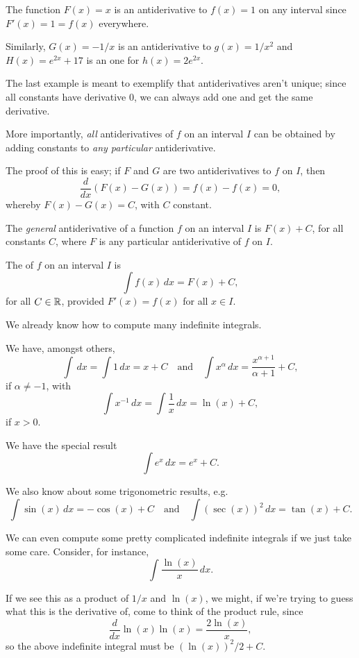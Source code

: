 \begin{example}
	The function $F(x) = x$ is an antiderivative to $f(x) = 1$ on any interval since $F'(x) = 1 = f(x)$ everywhere.

	Similarly, $G(x) = -1/x$ is an antiderivative to $g(x) = 1/x^2$ and $H(x) = e^{2x} + 17$ is an one for $h(x) = 2 e^{2 x}$.
\end{example}

\noindent
The last example is meant to exemplify that antiderivatives aren't unique; since all constants have derivative $0$, we can always add one and get the same derivative.

More importantly, \emph{all} antiderivatives of $f$ on an interval $I$ can be obtained by adding constants to \emph{any particular} antiderivative.

The proof of this is easy; if $F$ and $G$ are two antiderivatives to $f$ on $I$, then
\[
	\frac{d}{d x} (F(x) - G(x)) = f(x) - f(x) = 0,
\]
whereby $F(x) - G(x) = C$, with $C$ constant.


The \emph{general} antiderivative of a function $f$ on an interval $I$ is $F(x) + C$, for all constants $C$, where $F$ is any particular antiderivative of $f$ on $I$.

\begin{definition}
	The  of $f$ on an interval $I$ is
	\[
		\int f(x) \, d x = F(x) + C,
	\]
	for all $C \in \mathbb{R}$, provided $F'(x) = f(x)$ for all $x \in I$.
\end{definition}

\noindent
We already know how to compute many indefinite integrals.

\begin{examples}
	We have, amongst others,
	\[
		\int \, d x = \int 1 \, d x = x + C \quad \text{and} \quad \int x^\alpha \, d x = \frac{x^{\alpha + 1}}{\alpha + 1} + C,
	\]
	if $\alpha \neq -1$, with
	\[
		\int x^{-1} \, d x = \int \frac{1}{x} \, d x = \ln(x) + C,
	\]
	if $x > 0$.

	We have the special result
	\[
		\int e^x \, d x = e^x + C.
	\]

	\noindent
	We also know about some trigonometric results, e.g.
	\[
		\int \sin(x) \, d x = - \cos(x) + C \quad \text{and} \quad \int (\sec(x))^2 \, d x = \tan(x) + C.
	\]

	\noindent
	We can even compute some pretty complicated indefinite integrals if we just take some care.
	Consider, for instance,
	\[
		\int \frac{\ln(x)}{x} \, d x.
	\]

	\noindent
	If we see this as a product of $1/x$ and $\ln(x)$, we might, if we're trying to guess what this is the derivative of, come to think of the product rule, since
	\[
		\frac{d}{d x} \ln(x) \ln(x) = \frac{2 \ln(x)}{x},
	\]
	so the above indefinite integral must be $(\ln(x))^2 / 2 + C$.
\end{examples}

